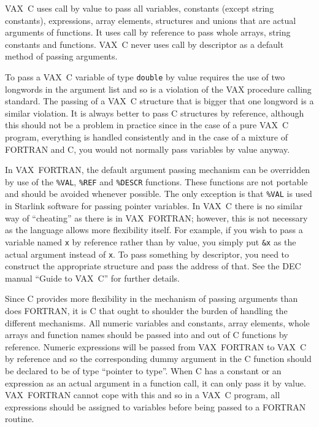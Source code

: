 \documentclass[twoside,11pt,nolof]{starlink}
\begin{document}
VAX~C uses call by value to pass all variables, constants (except string
constants), expressions, array elements, structures and unions that are actual
arguments of functions. It uses call by reference to pass whole arrays, string
constants and functions. VAX~C never uses call by descriptor as a default
method of passing arguments.

To pass a VAX~C variable of type \texttt{double} by value requires the use of two
longwords in the argument list and so is a violation of the VAX procedure
calling standard. The passing of a VAX~C structure that is bigger that one
longword is a similar violation. It is always better to pass C structures by
reference, although this should not be a problem in practice since in the case
of a pure VAX~C program, everything is handled consistently and in the case of
a mixture of FORTRAN and C, you would not normally pass variables by value
anyway.

In VAX~FORTRAN, the default argument passing mechanism can be overridden by use
of the \texttt{\%VAL}, \texttt{\%REF} and \texttt{\%DESCR} functions.
These functions are not portable and should be avoided whenever possible.
The only exception is that \texttt{\%VAL} is used in Starlink software for
passing pointer variables.
In VAX~C there is no similar way of ``cheating'' as there is in VAX~FORTRAN;
however, this is not necessary as the language allows more flexibility itself.
For example, if you wish to pass a variable named \texttt{x} by reference rather
than by value, you simply put \texttt{\&x} as the actual argument instead of
\texttt{x}.
To pass something by descriptor, you need to construct the appropriate
structure and pass the address of that. See the DEC manual ``Guide to VAX~C''
for further details.

Since C provides more flexibility in the mechanism of passing arguments than
does FORTRAN, it is C that ought to shoulder the burden of handling the
different mechanisms. All numeric variables and constants, array elements,
whole arrays and function names should be passed into and out of C functions by
reference. Numeric expressions will be passed from VAX~FORTRAN to VAX~C by
reference and so the corresponding dummy argument in the C function should be
declared to be of type ``pointer to type''. When C has a constant or an
expression as an actual argument in a function call, it can only pass it by
value. VAX~FORTRAN cannot cope with this and so in a VAX~C program, all
expressions should be assigned to variables before being passed to a FORTRAN
routine.
\end{document}

